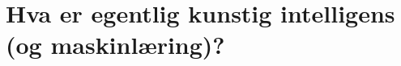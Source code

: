 \documentclass[8pt]{beamer}
\begin{document}

    \section{Hva er egentlig kunstig intelligens (og maskinlæring)?}
\end{document}
